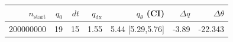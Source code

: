 \begin{tabular}{r r r r r r r}
\hline
$n_{\mathrm{start}}$ & $q_0$ & $dt$ & $q_{\mathrm{dx}}$ & $q_{\theta}$ (CI) & $\Delta q$ & $\Delta\theta$ \\
\hline
200000000 & 19 & 15 & 1.55 & 5.44 [5.29,5.76] & -3.89 & -22.343 \\
\hline
\end{tabular}

